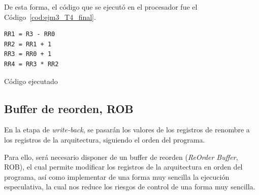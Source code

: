 \begin{ejemplo}
    De esta forma, el código que se ejecutó en el procesador fue el Código~\ref{cod:ejm3_T4_final}.
    \begin{listing}[H]
    \begin{verbatim}
RR1 = R3 - RR0
RR2 = RR1 + 1
RR3 = RR0 + 1
RR4 = RR3 * RR2
    \end{verbatim}
    \caption{Código ejecutado}
    \label{cod:ejm3_T4_final}
    \end{listing}
\end{ejemplo}

\subsection{Buffer de reorden, ROB}
En la etapa de \emph{write-back}, se pasarán los valores de los registros de renombre a los registros de la arquitectura, siguiendo el orden del programa.

Para ello, será necesario disponer de un buffer de reorden (\emph{ReOrder Buffer}, ROB), el cual permite modificar los registros de la arquitectura en orden del programa, así como implementar de una forma muy sencilla la ejecución especulativa, la cual nos reduce los riesgos de control de una forma muy sencilla.

